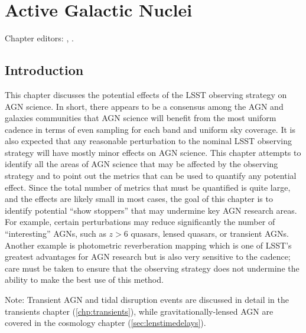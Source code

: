 
\chapter[AGN]{Active Galactic Nuclei}
\def\chpname{agn}\label{chp:\chpname}

Chapter editors:
,
.


\section{Introduction}
\label{sec:\chpname:intro}


This chapter discusses the potential effects of the LSST observing
strategy on AGN science. In short, there appears to be a consensus
among the AGN and galaxies communities that AGN science will benefit
from the most uniform cadence in terms of even sampling for each band
and uniform sky coverage. It is also expected that any reasonable
perturbation to the nominal LSST observing strategy will have mostly
minor effects on AGN science. This chapter attempts to identify all
the areas of AGN science that may be affected by the observing strategy
and to point out the metrics that can be used to quantify any potential
effect. Since the total number of metrics that must be quantified is
quite large, and the effects are likely small in most cases, the goal
of this chapter is to identify potential ``show stoppers'' that may undermine
key AGN research areas. For example, certain perturbations may reduce
significantly the number of ``interesting'' AGNs, such as $z>6$ quasars,
lensed quasars, or transient AGNs. Another example is photometric
reverberation mapping which is one of LSST's greatest advantages for
AGN research but is also very sensitive to the cadence; care must be
taken to ensure that the observing strategy does not undermine the
ability to make the best use of this method.

Note: Transient AGN and tidal disruption events are discussed in
detail in the transients chapter
(\autoref{chp:transients}), while gravitationally-lensed AGN are
covered in the cosmology chapter (\autoref{sec:lenstimedelays}).


